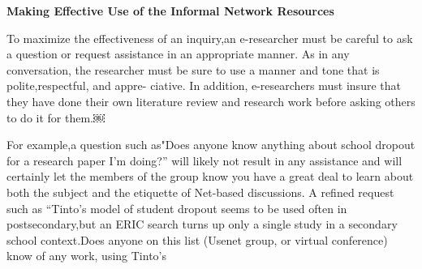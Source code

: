 \documentclass{article}
\begin{document}
\vspace{5mm}
\hspace{-2cm}
\textbf{Making Effective Use of the Informal Network Resources}
\vspace{5mm}

To maximize the effectiveness of an inquiry,an e-researcher must be careful to ask a question or request assistance in an appropriate manner. As in any conversation, the researcher must be sure to use a manner and tone that is polite,respectful, and appre-
ciative. In addition, e-researchers must insure that they have done their own literature review and research work before asking others to do it for them.￼

For example,a question such as"Does anyone know anything about school dropout for a research paper I'm doing?” will likely not result in any assistance and will certainly let the members of the group know you have a great deal to learn about both
the subject and the etiquette of Net-based discussions. A refined request such as “Tinto's model of student dropout seems to be used often in postsecondary,but an ERIC search turns up only a single study in a secondary school context.Does anyone
on this list (Usenet group, or virtual conference) know of any work, using Tinto's 
\end{document}
